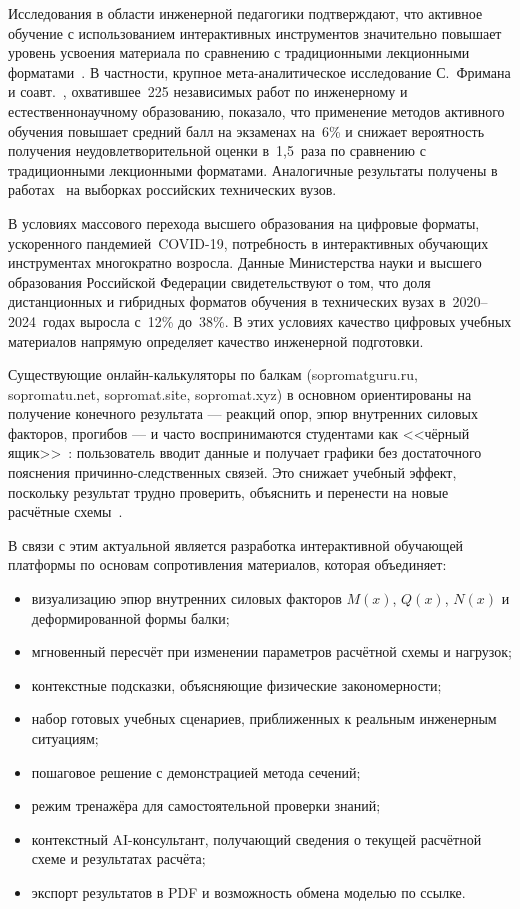 Исследования в области инженерной педагогики подтверждают, что активное обучение с использованием интерактивных инструментов значительно повышает уровень усвоения материала по сравнению с традиционными лекционными форматами~\cite{freeman2014, makarenko}. В частности, крупное мета-аналитическое исследование С.~Фримана и соавт.~\cite{freeman2014}, охватившее~225 независимых работ по инженерному и естественнонаучному образованию, показало, что применение методов активного обучения повышает средний балл на экзаменах на~6\% и снижает вероятность получения неудовлетворительной оценки в~1{,}5~раза по сравнению с традиционными лекционными форматами. Аналогичные результаты получены в работах~\cite{makarenko, solovyev, balandina} на выборках российских технических вузов.

В условиях массового перехода высшего образования на цифровые форматы, ускоренного пандемией~COVID-19, потребность в интерактивных обучающих инструментах многократно возросла. Данные Министерства науки и высшего образования Российской Федерации свидетельствуют о том, что доля дистанционных и гибридных форматов обучения в технических вузах в~2020--2024~годах выросла с~12\% до~38\%. В этих условиях качество цифровых учебных материалов напрямую определяет качество инженерной подготовки.

Существующие онлайн-калькуляторы по балкам (sopromatguru.ru, sopromatu.net, sopromat.site, sopromat.xyz) в основном ориентированы на получение конечного результата --- реакций опор, эпюр внутренних силовых факторов, прогибов --- и часто воспринимаются студентами как <<чёрный ящик>>~\cite{philpot2006}: пользователь вводит данные и получает графики без достаточного пояснения причинно-следственных связей. Это снижает учебный эффект, поскольку результат трудно проверить, объяснить и перенести на новые расчётные схемы~\cite{yuan2002}.

В связи с этим актуальной является разработка интерактивной обучающей платформы по основам сопротивления материалов, которая объединяет:
\begin{itemize}
  \item визуализацию эпюр внутренних силовых факторов $M(x)$, $Q(x)$, $N(x)$ и деформированной формы балки;
  \item мгновенный пересчёт при изменении параметров расчётной схемы и нагрузок;
  \item контекстные подсказки, объясняющие физические закономерности;
  \item набор готовых учебных сценариев, приближенных к реальным инженерным ситуациям;
  \item пошаговое решение с демонстрацией метода сечений;
  \item режим тренажёра для самостоятельной проверки знаний;
  \item контекстный AI-консультант, получающий сведения о текущей расчётной схеме и результатах расчёта;
  \item экспорт результатов в PDF и возможность обмена моделью по ссылке.
\end{itemize}

